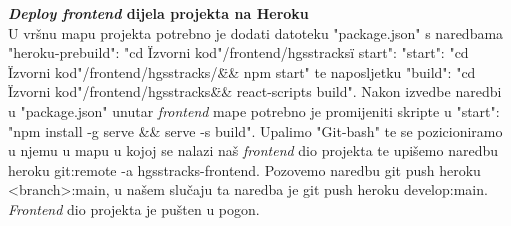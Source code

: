 			\textbf{\textit{Deploy frontend} dijela projekta na Heroku}\\
			
			{U vršnu mapu projekta potrebno je dodati datoteku "package.json" s naredbama "heroku-prebuild": "cd \"Izvorni kod"/frontend/hgsstracks\" i start": "start": "cd \"Izvorni kod"/frontend/hgsstracks/\" \&\& npm start" te naposljetku "build": "cd \"Izvorni kod"/frontend/hgsstracks\" \&\& react-scripts build". Nakon izvedbe naredbi u "package.json" unutar \textit{frontend} mape potrebno je promijeniti skripte u "start": "npm install -g serve \&\& serve -s build". Upalimo "Git-bash" te se pozicioniramo u njemu u mapu u kojoj se nalazi naš \textit{frontend} dio projekta te upišemo naredbu heroku git:remote -a hgsstracks-frontend. Pozovemo naredbu git push heroku <branch>:main, u našem slučaju ta naredba je git push heroku develop:main. \textit{Frontend} dio projekta je pušten u pogon.}\\
			
			
			
			
			\eject 
